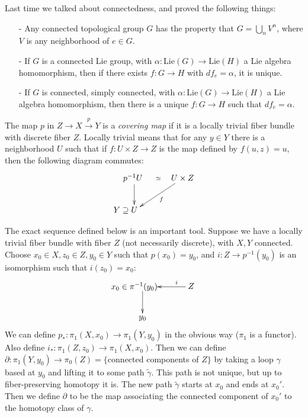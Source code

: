  \setcounter{lecture}{5}

 Last time we talked about connectedness, and proved the following things:
 \begin{itemize}
 \item[-] Any connected topological group $G$ has the
 property that $G=\bigcup_n V^n$, where $V$ is any neighborhood of $e\in G$.

 \item[-] If $G$ is a connected Lie group, with $\alpha:\mathrm{Lie}(G)\to
 \mathrm{Lie}(H)$ a Lie algebra homomorphism, then if there exists $f:G\to H$ with
 $df_e=\alpha$, it is unique.

 \item[-] If $G$ is connected, simply connected, with $\alpha:\mathrm{Lie}(G)\to
 \mathrm{Lie}(H)$ a Lie algebra homomorphism, then there is a unique $f:G\to H$ such
 that $df_e=\alpha$.
 \end{itemize}

 The map $p$ in $Z\to X\xrightarrow{p} Y$ is a \emph{covering
 map} if it is a locally trivial fiber bundle with discrete fiber
 $Z$.  Locally trivial means that for any $y \in Y$ there is a neighborhood $U$ such
 that if $f:U \times Z \rightarrow Z$ is the map defined by $f(u,z)=u$, then the
 following diagram commutes:
 \[\xymatrix{
 p^{-1}U \ar[d]  \ar@{}[r]|{\simeq} \ & U\times Z \ar[dl]^(.5)f\\
 **[l] Y \supseteq U }\]

 The exact sequence defined below is an important tool.  Suppose we have a locally
 trivial fiber bundle with fiber $Z$ (not necessarily discrete), with $X,Y$ connected.
 Choose $x_0\in X, z_0\in Z, y_0\in Y$ such that $p(x_0)=y_0$, and $i:Z \rightarrow
 p^{-1}(y_0)$ is an isomorphism such that $i(z_0)=x_0$:
 \[\xymatrix{
   *!<1em,0em>{ x_0 \in \pi^{-1}(y_0)} \ar[d] & Z\ar[l]_(.3)i\\
   y_0 }\]
   We can define $p_*:\pi_1(X,x_0)\to \pi_1(Y,y_0)$ in the obvious way ($\pi_1$ is a functor).
   Also define $i_*:\pi_1(Z,z_0)\to \pi_1(X,x_0)$. Then we can
 define $\partial:\pi_1(Y,y_0)\to \pi_0(Z)=\{$connected components of $Z\}$ by taking
 a loop $\gamma$ based at $y_0$ and lifting it to some path $\tilde{\gamma}$.  This path is not unique, but up to fiber-preserving homotopy it is. The new path $\tilde{\gamma}$ starts at
 $x_0$ and ends at $x_0'$.  Then we define $\partial$ to be the map associating the connected component of $x_0'$ to the homotopy class of $\gamma$.

